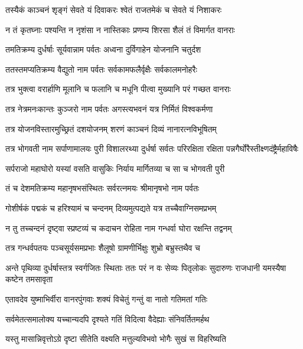 \twolineshloka
{तस्यैकं काञ्चनं शृङ्गं सेवते यं दिवाकरः}
{श्वेतं राजतमेकं च सेवते यं निशाकरः} %

\twolineshloka
{न तं कृतघ्नाः पश्यन्ति न नृशंसा न नास्तिकाः}
{प्रणम्य शिरसा शैलं तं विमार्गत वानराः} %

\twolineshloka
{तमतिक्रम्य दुर्धर्षाः सूर्यवान्नाम पर्वतः}
{अध्वना दुर्विगाहेन योजनानि चतुर्दश} %

\twolineshloka
{ततस्तमप्यतिक्रम्य वैद्युतो नाम पर्वतः}
{सर्वकामफलैर्वृक्षैः सर्वकालमनोहरैः} %

\twolineshloka
{तत्र भुक्त्वा वरार्हाणि मूलानि च फलानि च}
{मधूनि पीत्वा मुख्यानि परं गच्छत वानराः} %

\twolineshloka
{तत्र नेत्रमनःकान्तः कुञ्जरो नाम पर्वतः}
{अगस्त्यभवनं यत्र निर्मितं विश्वकर्मणा} %

\twolineshloka
{तत्र योजनविस्तारमुच्छ्रितं दशयोजनम्}
{शरणं काञ्चनं दिव्यं नानारत्नविभूषितम्} %

\threelineshloka
{तत्र भोगवती नाम सर्पाणामालयः पुरी}
{विशालरथ्या दुर्धर्षा सर्वतः परिरक्षिता}
{रक्षिता पन्नगैर्घोरैस्तीक्ष्णदंष्ट्रैर्महाविषैः} %

\twolineshloka
{सर्पराजो महाघोरो यस्यां वसति वासुकिः}
{निर्याय मार्गितव्या च सा च भोगवती पुरी} %

\twolineshloka
{तं च देशमतिक्रम्य महानृषभसंस्थितः}
{सर्वरत्नमयः श्रीमानृषभो नाम पर्वतः} %

\twolineshloka
{गोशीर्षकं पद्मकं च हरिश्यामं च चन्दनम्}
{दिव्यमुत्पद्यते यत्र तच्चैवाग्निसमप्रभम्} %

\twolineshloka
{न तु तच्चन्दनं दृष्ट्वा स्प्रष्टव्यं च कदाचन}
{रोहिता नाम गन्धर्वा घोरा रक्षन्ति तद्वनम्} %

\twolineshloka
{तत्र गन्धर्वपतयः पञ्चसूर्यसमप्रभाः}
{शैलूषो ग्रामणीर्भिक्षुः शुभ्रो बभ्रुस्तथैव च} %

\threelineshloka
{अन्ते पृथिव्या दुर्धर्षास्तत्र स्वर्गजितः स्थिताः}
{ततः परं न वः सेव्यः पितृलोकः सुदारुणः}
{राजधानी यमस्यैषा कष्टेन तमसावृता} %

\twolineshloka
{एतावदेव युष्माभिर्वीरा वानरपुंगवाः}
{शक्यं विचेतुं गन्तुं वा नातो गतिमतां गतिः} %

\twolineshloka
{सर्वमेतत्समालोक्य यच्चान्यदपि दृश्यते}
{गतिं विदित्वा वैदेह्याः संनिवर्तितमर्हथ} %

\twolineshloka
{यस्तु मासान्निवृत्तोऽग्रे दृष्टा सीतेति वक्ष्यति}
{मत्तुल्यविभवो भोगैः सुखं स विहरिष्यति} %

